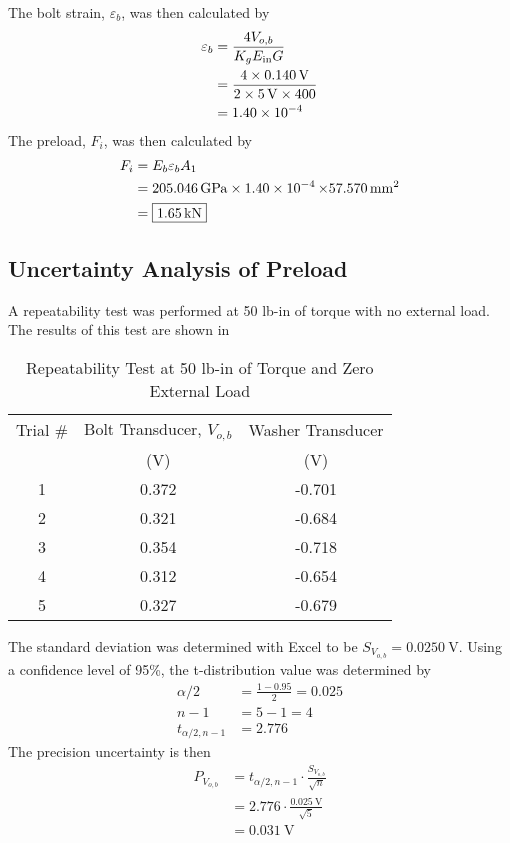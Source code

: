 The bolt strain, $\varepsilon_b$, was then calculated by
\begin{align*}
    \varepsilon_b &= \frac{4 V_{o, b}}{K_g E_{\text{in}} G} \\
    &= \frac{4 \times \qty{0.140}{V}}{2 \times \qty{5}{V} \times 400} \\
    &= \qty{1.40E-04}{}
\end{align*}
The preload, $F_i$, was then calculated by
\begin{align*}
    F_i &= E_b \varepsilon_b A_1 \\
    &= \qty{205.046}{\giga\pascal} \times \qty{1.40E-04} \times \qty{57.570}{\milli\meter\squared} \\
    &= \boxed{\qty{1.65}{\kilo\newton}}
\end{align*}

\subsection{Uncertainty Analysis of Preload}
A repeatability test was performed at 50 lb-in of torque with no external load. The results of this test are shown in 
\begin{table}[h]
    \centering
    \caption{Repeatability Test at 50 lb-in of Torque and Zero External Load}
    \label{tab:repeatability_test}
    \begin{tabular}{ccc}
    \toprule
    Trial \# & Bolt Transducer, $V_{o, b}$ & Washer Transducer \\
    & (V) & (V) \\
    \midrule
    1 & 0.372 & -0.701 \\
    2 & 0.321 & -0.684 \\
    3 & 0.354 & -0.718 \\
    4 & 0.312 & -0.654 \\
    5 & 0.327 & -0.679 \\
    \bottomrule
    \end{tabular}
\end{table}
The standard deviation was determined with Excel to be $S_{V_{o,b}} = \qty{0.0250}{\volt}$. Using a confidence level of 95\%, the t-distribution value was determined by
\begin{align*}
    \alpha/2 &= \frac{1 - 0.95}{2} = 0.025 \\
    n - 1 &= 5 - 1 = 4 \\
    t_{\alpha/2, n-1} &= 2.776
\end{align*}
The precision uncertainty is then
\begin{align*}
    P_{V_{o, b}} &= t_{\alpha/2, n-1} \cdot \frac{S_{V_{o, b}}}{\sqrt{n}} \\
    &= 2.776 \cdot \frac{\qty{0.025}{\volt}}{\sqrt{5}} \\
    &= \qty{0.031}{\volt}
\end{align*}
